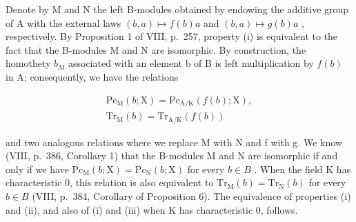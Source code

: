 Denote by M and N the left B-modules obtained by endowing the additive group of A with the external laws \((b,a)\mapsto f(b)a\) and \((b,a)\mapsto g(b)a\) , respectively. By Proposition 1 of VIII, p.~257, property (i) is equivalent to the fact that the B-modules M and N are isomorphic. By construction, the homothety \(b_{M}\) associated with an element b of B is left multiplication by \(f(b)\) in A; consequently, we have the relations

\[
\begin{array}{c} \mathrm {Pc_ {M}} (b; \mathrm{X}) = \mathrm {Pc_ {A / K}} (f (b); \mathrm{X}), \\ \mathrm{Tr} _ {\mathrm{M}} (b) = \mathrm{Tr} _ {\mathrm{A/K}} (f (b)) \end{array}
\]

and two analogous relations where we replace M with N and f with g. We know (VIII, p.~386, Corollary 1) that the B-modules M and N are isomorphic if and only if we have \(\mathrm{Pc}_{\mathrm{M}}(b;\mathrm{X})=\mathrm{Pc}_{\mathrm{N}}(b;\mathrm{X})\) for every \(b\in B\) . When the field K has characteristic 0, this relation is also equivalent to \(\mathrm{Tr}_{\mathrm{M}}(b)=\mathrm{Tr}_{\mathrm{N}}(b)\) for every \(b\in B\) (VIII, p.~384, Corollary of Proposition 6). The equivalence of properties (i) and (ii), and also of (i) and (iii) when K has characteristic 0, follows.

